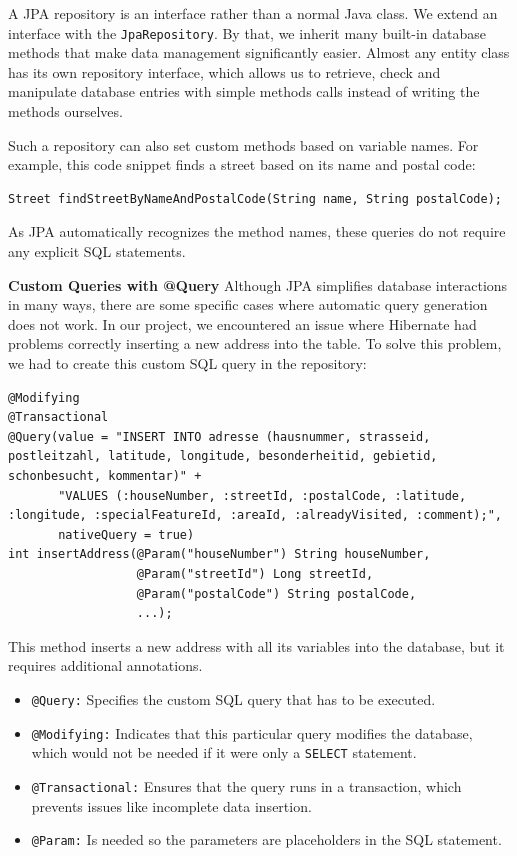     A JPA repository is an interface rather than a normal Java class. We extend an interface with the \texttt{JpaRepository}. By that, we inherit many built-in database methods that make data management significantly easier. Almost any entity class has its own repository interface, which allows us to retrieve, check and manipulate database entries with simple methods calls instead of writing the methods ourselves. \newline

    Such a repository can also set custom methods based on variable names. For example, this code snippet finds a street based on its name and postal code:
    \lstset{style=java, caption=Find Street By Name And Postal Code}
    \begin{verbatim}
Street findStreetByNameAndPostalCode(String name, String postalCode);          
    \end{verbatim} 
    As JPA automatically recognizes the method names, these queries do not require any explicit SQL statements.

    \textbf{Custom Queries with @Query} \newline
    Although JPA simplifies database interactions in many ways, there are some specific cases where automatic query generation does not work. In our project, we encountered an issue where Hibernate had problems correctly inserting a new address into the table. To solve this problem, we had to create this custom SQL query in the repository:
    \lstset{style=java, caption=Insert Address with Custom Query}
    \begin{verbatim}
@Modifying
@Transactional
@Query(value = "INSERT INTO adresse (hausnummer, strasseid, postleitzahl, latitude, longitude, besonderheitid, gebietid, schonbesucht, kommentar)" +
       "VALUES (:houseNumber, :streetId, :postalCode, :latitude, :longitude, :specialFeatureId, :areaId, :alreadyVisited, :comment);",
       nativeQuery = true)
int insertAddress(@Param("houseNumber") String houseNumber,
                  @Param("streetId") Long streetId,
                  @Param("postalCode") String postalCode,
                  ...);          
    \end{verbatim} 

    This method inserts a new address with all its variables into the database, but it requires additional annotations.
    \begin{itemize}
        \item \texttt{@Query:} Specifies the custom SQL query that has to be executed.
        \item \texttt{@Modifying:} Indicates that this particular query modifies the database, which would not be needed if it were only a \texttt{SELECT} statement.
        \item \texttt{@Transactional:} Ensures that the query runs in a transaction, which prevents issues like incomplete data insertion.
        \item \texttt{@Param:} Is needed so the parameters are placeholders in the SQL statement.
    \end{itemize}

